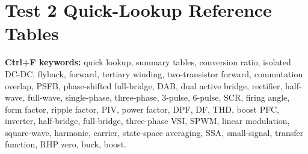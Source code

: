 \clearpage
\section{Test 2 Quick-Lookup Reference Tables}

\noindent\textbf{Ctrl+F keywords:} quick lookup, summary tables, conversion ratio, isolated DC-DC, flyback, forward, tertiary winding, two-transistor forward, commutation overlap, PSFB, phase-shifted full-bridge, DAB, dual active bridge, rectifier, half-wave, full-wave, single-phase, three-phase, 3-pulse, 6-pulse, SCR, firing angle, form factor, ripple factor, PIV, power factor, DPF, DF, THD, boost PFC, inverter, half-bridge, full-bridge, three-phase VSI, SPWM, linear modulation, square-wave, harmonic, carrier, state-space averaging, SSA, small-signal, transfer function, RHP zero, buck, boost.

\vspace{-4pt}
